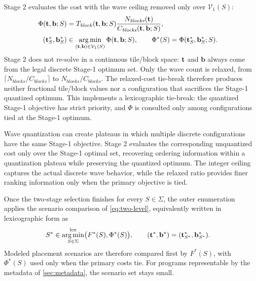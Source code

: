 Stage 2 evaluates the cost with the wave ceiling removed only over \(\mathcal{V}_1(S)\):
\begin{equation}
\begin{aligned}
\Phi(\mathbf{t},\mathbf{b};S)
&=T_{\mathit{block}}(\mathbf{t},\mathbf{b};S)
 \frac{N_{\mathit{blocks}}(\mathbf{t})}
      {C_{\mathit{blocks}}(\mathbf{t},\mathbf{b};S)},\\[0.4ex]
(\mathbf{t}_S^*,\mathbf{b}_S^*)
&\in \mathop{\arg\min}_{(\mathbf{t},\mathbf{b})\in\mathcal{V}_1(S)}
 \Phi(\mathbf{t},\mathbf{b};S),
\qquad
\Phi^*(S)=\Phi(\mathbf{t}_S^*,\mathbf{b}_S^*;S).
\end{aligned}
\label{eq:relaxed-cost}
\end{equation}
Stage 2 does not re-solve in a continuous tile/block space: \(\mathbf{t}\) and \(\mathbf{b}\) always come from the legal discrete Stage-1 optimum set. Only the wave count is relaxed, from \(\lceil N_{\mathit{blocks}}/C_{\mathit{blocks}}\rceil\) to \(N_{\mathit{blocks}}/C_{\mathit{blocks}}\). The relaxed-cost tie-break therefore produces neither fractional tile/block values nor a configuration that sacrifices the Stage-1 quantized optimum. This implements a lexicographic tie-break: the quantized Stage-1 objective has strict priority, and \(\Phi\) is consulted only among configurations tied at the Stage-1 optimum.

Wave quantization can create plateaus in which multiple discrete configurations have the same Stage-1 objective. Stage 2 evaluates the corresponding unquantized cost only over the Stage-1 optimal set, recovering ordering information within a quantization plateau while preserving the quantized optimum. The integer ceiling captures the actual discrete wave behavior, while the relaxed ratio provides finer ranking information only when the primary objective is tied.

Once the two-stage selection finishes for every \(S\in\Sigma\), the outer enumeration applies the scenario comparison of \autoref{eq:two-level}, equivalently written in lexicographic form as
\begin{equation}
S^*\in \mathop{\arg\min}_{S\in\Sigma}^{\mathrm{lex}}
   \bigl(F^*(S),\Phi^*(S)\bigr),
\qquad
(\mathbf{t}^*,\mathbf{b}^*)=(\mathbf{t}_{S^*}^*,\mathbf{b}_{S^*}^*).
\label{eq:outer-selection}
\end{equation}
Modeled placement scenarios are therefore compared first by \(F^*(S)\), with \(\Phi^*(S)\) used only when the primary costs tie. For programs representable by the metadata of \autoref{sec:metadata}, the scenario set stays small.

